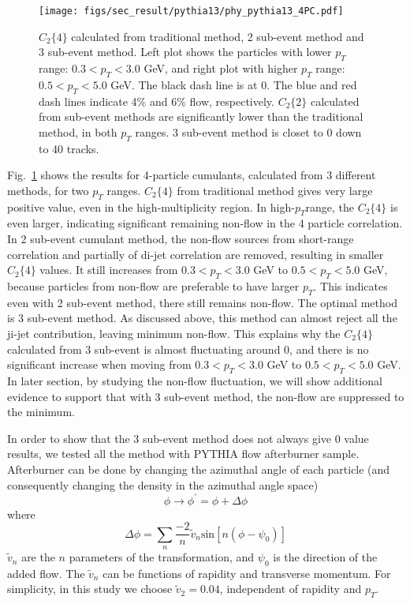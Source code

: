 \begin{figure}[H]
\centering
\texttt{[image: figs/sec\_result/pythia13/phy\_pythia13\_4PC.pdf]}
\caption{$C_{2}\{4\}$ calculated from traditional method, 2 sub-event method and 3 sub-event method. Left plot shows the particles with lower $p_{T}$ range: $0.3<p_{T}<3.0$ GeV, and right plot with higher $p_{T}$ range: $0.5<p_{T}<5.0$ GeV. The black dash line is at 0. The blue and red dash lines indicate 4$\%$ and 6$\%$ flow, respectively. $C_{2}\{2\}$ calculated from sub-event methods are significantly lower than the traditional method, in both $p_{T}$ ranges. 3 sub-event method is closet to 0 down to 40 tracks.}
\label{fig:phy_pythia13_4PC}
\end{figure}

Fig.~\ref{fig:phy_pythia13_4PC} shows the results for 4-particle cumulants, calculated from 3 different methods, for two $p_{T}$ ranges. $C_{2}\{4\}$ from traditional method gives very large positive value, even in the high-multiplicity region. In high-$p_{T}$range, the $C_{2}\{4\}$ is even larger, indicating significant remaining non-flow in the 4 particle correlation. In 2 sub-event cumulant method, the non-flow sources from short-range correlation and partially of di-jet correlation are removed, resulting in smaller $C_{2}\{4\}$ values. It still increases from $0.3<p_{T}<3.0$ GeV to $0.5<p_{T}<5.0$ GeV, because particles from non-flow are preferable to have larger $p_{T}$. This indicates even with 2 sub-event method, there still remains non-flow. The optimal method is 3 sub-event method. As discussed above, this method can almost reject all the ji-jet contribution, leaving minimum non-flow. This explains why the $C_{2}\{4\}$ calculated from 3 sub-event is almost fluctuating around 0, and there is no significant increase when moving from $0.3<p_{T}<3.0$ GeV to $0.5<p_{T}<5.0$ GeV. In later section, by studying the non-flow fluctuation, we will show additional evidence to support that with 3 sub-event method, the non-flow are suppressed to the minimum.

In order to show that the 3 sub-event method does not always give 0 value results, we tested all the method with PYTHIA flow afterburner sample. Afterburner can be done by changing the azimuthal angle of each particle (and consequently changing the density in the azimuthal angle space)
\begin{equation}
\phi\to\phi^{'}=\phi+\Delta\phi
\end{equation}
where
\begin{equation}
\Delta\phi=\sum_{n}\frac{-2}{n}\tilde{v}_{n}\text{sin}[n(\phi-\psi_{0})]
\end{equation}
$\tilde{v}_{n}$ are the $n$ parameters of the transformation, and $\psi_{0}$ is the direction of the added flow. The $\tilde{v}_{n}$ can be functions  of rapidity and transverse momentum. For simplicity, in this study we choose $\tilde{v}_{2}=0.04$, independent of rapidity and $p_{T}$.

